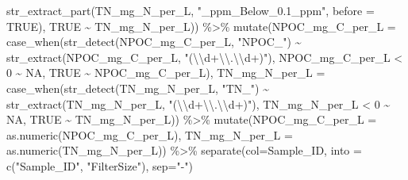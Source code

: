\documentclass[
]{article}
\newenvironment{Shaded}{\begin{snugshade}}{\end{snugshade}}
\newcommand{\AttributeTok}[1]{\textcolor[rgb]{0.77,0.63,0.00}{#1}}
\newcommand{\ConstantTok}[1]{\textcolor[rgb]{0.00,0.00,0.00}{#1}}
\newcommand{\DecValTok}[1]{\textcolor[rgb]{0.00,0.00,0.81}{#1}}
\newcommand{\FunctionTok}[1]{\textcolor[rgb]{0.00,0.00,0.00}{#1}}
\newcommand{\NormalTok}[1]{#1}
\newcommand{\SpecialCharTok}[1]{\textcolor[rgb]{0.00,0.00,0.00}{#1}}
\newcommand{\StringTok}[1]{\textcolor[rgb]{0.31,0.60,0.02}{#1}}
\begin{document}
\begin{Shaded}
\begin{Highlighting}[]
                                        \FunctionTok{str\_extract\_part}\NormalTok{(TN\_mg\_N\_per\_L, }\StringTok{"\_ppm\_Below\_0.1\_ppm"}\NormalTok{, }\AttributeTok{before =} \ConstantTok{TRUE}\NormalTok{),}
                               \ConstantTok{TRUE} \SpecialCharTok{\textasciitilde{}}\NormalTok{ TN\_mg\_N\_per\_L)) }\SpecialCharTok{\%\textgreater{}\%}
  \FunctionTok{mutate}\NormalTok{(}\AttributeTok{NPOC\_mg\_C\_per\_L =} \FunctionTok{case\_when}\NormalTok{(}\FunctionTok{str\_detect}\NormalTok{(NPOC\_mg\_C\_per\_L, }\StringTok{"NPOC\_"}\NormalTok{) }\SpecialCharTok{\textasciitilde{}} 
                                     \FunctionTok{str\_extract}\NormalTok{(NPOC\_mg\_C\_per\_L, }\StringTok{"(}\SpecialCharTok{\textbackslash{}\textbackslash{}}\StringTok{d+}\SpecialCharTok{\textbackslash{}\textbackslash{}}\StringTok{.}\SpecialCharTok{\textbackslash{}\textbackslash{}}\StringTok{d+)"}\NormalTok{),}
\NormalTok{                                     NPOC\_mg\_C\_per\_L }\SpecialCharTok{\textless{}} \DecValTok{0} \SpecialCharTok{\textasciitilde{}} \ConstantTok{NA}\NormalTok{,}
                                     \ConstantTok{TRUE} \SpecialCharTok{\textasciitilde{}}\NormalTok{ NPOC\_mg\_C\_per\_L),}
         \AttributeTok{TN\_mg\_N\_per\_L =} \FunctionTok{case\_when}\NormalTok{(}\FunctionTok{str\_detect}\NormalTok{(TN\_mg\_N\_per\_L, }\StringTok{"TN\_"}\NormalTok{) }\SpecialCharTok{\textasciitilde{}} 
                                     \FunctionTok{str\_extract}\NormalTok{(TN\_mg\_N\_per\_L, }\StringTok{"(}\SpecialCharTok{\textbackslash{}\textbackslash{}}\StringTok{d+}\SpecialCharTok{\textbackslash{}\textbackslash{}}\StringTok{.}\SpecialCharTok{\textbackslash{}\textbackslash{}}\StringTok{d+)"}\NormalTok{),}
\NormalTok{                                     TN\_mg\_N\_per\_L }\SpecialCharTok{\textless{}} \DecValTok{0} \SpecialCharTok{\textasciitilde{}} \ConstantTok{NA}\NormalTok{, }
                                     \ConstantTok{TRUE} \SpecialCharTok{\textasciitilde{}}\NormalTok{ TN\_mg\_N\_per\_L)) }\SpecialCharTok{\%\textgreater{}\%}
  \FunctionTok{mutate}\NormalTok{(}\AttributeTok{NPOC\_mg\_C\_per\_L =} \FunctionTok{as.numeric}\NormalTok{(NPOC\_mg\_C\_per\_L),}
         \AttributeTok{TN\_mg\_N\_per\_L =} \FunctionTok{as.numeric}\NormalTok{(TN\_mg\_N\_per\_L)) }\SpecialCharTok{\%\textgreater{}\%}
  \FunctionTok{separate}\NormalTok{(}\AttributeTok{col=}\NormalTok{Sample\_ID, }\AttributeTok{into =} \FunctionTok{c}\NormalTok{(}\StringTok{"Sample\_ID"}\NormalTok{, }\StringTok{"FilterSize"}\NormalTok{), }\AttributeTok{sep=}\StringTok{"{-}"}\NormalTok{) }


\end{Highlighting}
\end{Shaded}
\end{document}

